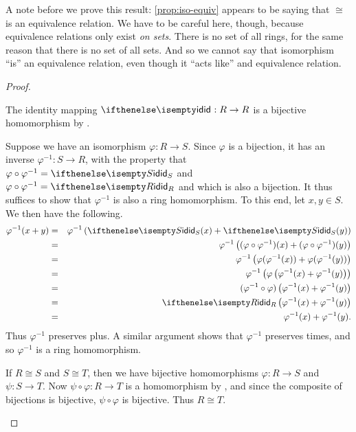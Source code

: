 A note before we prove this result: \ref{prop:iso-equiv} appears to be saying that \(\cong\) is an equivalence relation.
We have to be careful here, though, because equivalence relations only exist \emph{on sets}.
There is no set of all rings, for the same reason that there is no set of all sets.
And so we cannot say that isomorphism ``is'' an equivalence relation, even though it ``acts like'' and equivalence relation.

\begin{proof}
\begin{inlineproplist}
\item The identity mapping \(\ID : R \rightarrow R\) is a bijective homomorphism by .
\item Suppose we have an isomorphism \(\varphi : R \rightarrow S\).
Since \(\varphi\) is a bijection, it has an inverse \(\varphi^{-1} : S \rightarrow R\), with the property that \(\varphi \circ \varphi^{-1} = \ID[S]\) and \(\varphi \circ \varphi^{-1} = \ID[R]\) and which is also a bijection.
It thus suffices to show that \(\varphi^{-1}\) is also a ring homomorphism.
To this end, let \(x,y \in S\).
We then have the following.
\begin{eqnarray*}
\varphi^{-1}(x + y) & = & \varphi^{-1}\left(\ID[S](x) + \ID[S](y)\right) \\
 & = & \varphi^{-1}\left( (\varphi \circ \varphi^{-1})(x) + (\varphi \circ \varphi^{-1})(y) \right) \\
 & = & \varphi^{-1}\left( \varphi(\varphi^{-1}(x)) + \varphi(\varphi^{-1}(y)) \right) \\
 & = & \varphi^{-1}\left( \varphi\left( \varphi^{-1}(x) + \varphi^{-1}(y) \right) \right) \\
 & = & (\varphi^{-1} \circ \varphi)\left( \varphi^{-1}(x) + \varphi^{-1}(y) \right) \\
 & = & \ID[R]\left( \varphi^{-1}(x) + \varphi^{-1}(y) \right) \\
 & = & \varphi^{-1}(x) + \varphi^{-1}(y).
\end{eqnarray*}
Thus \(\varphi^{-1}\) preserves plus.
A similar argument shows that \(\varphi^{-1}\) preserves times, and so \(\varphi^{-1}\) is a ring homomorphism.
\item If \(R \cong S\) and \(S \cong T\), then we have bijective homomorphisms \(\varphi : R \rightarrow S\) and \(\psi : S \rightarrow T\).
Now \(\psi \circ \varphi : R \rightarrow T\) is a homomorphism by , and since the composite of bijections is bijective, \(\psi \circ \varphi\) is bijective. Thus \(R \cong T\).
\end{inlineproplist}
\end{proof}


